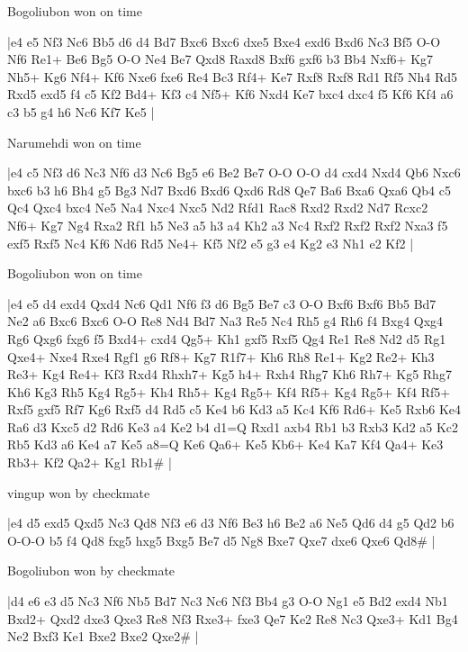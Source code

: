 Bogoliubon won on time

\makegametitle
|e4 e5 Nf3 Nc6 Bb5 d6 d4 Bd7 Bxc6 Bxc6 dxe5 Bxe4 exd6 Bxd6 Nc3 Bf5 O-O Nf6 Re1+ Be6 Bg5 O-O Ne4 Be7 Qxd8 Raxd8 Bxf6 gxf6 b3 Bb4 Nxf6+ Kg7 Nh5+ Kg6 Nf4+ Kf6 Nxe6 fxe6 Re4 Bc3 Rf4+ Ke7 Rxf8 Rxf8 Rd1 Rf5 Nh4 Rd5 Rxd5 exd5 f4 c5 Kf2 Bd4+ Kf3 c4 Nf5+ Kf6 Nxd4 Ke7 bxc4 dxc4 f5 Kf6 Kf4 a6 c3 b5 g4 h6 Nc6 Kf7 Ke5  |

\showboard

Narumehdi won on time

\makegametitle
|e4 c5 Nf3 d6 Nc3 Nf6 d3 Nc6 Bg5 e6 Be2 Be7 O-O O-O d4 cxd4 Nxd4 Qb6 Nxc6 bxc6 b3 h6 Bh4 g5 Bg3 Nd7 Bxd6 Bxd6 Qxd6 Rd8 Qe7 Ba6 Bxa6 Qxa6 Qb4 c5 Qc4 Qxc4 bxc4 Ne5 Na4 Nxc4 Nxc5 Nd2 Rfd1 Rac8 Rxd2 Rxd2 Nd7 Rcxc2 Nf6+ Kg7 Ng4 Rxa2 Rf1 h5 Ne3 a5 h3 a4 Kh2 a3 Nc4 Rxf2 Rxf2 Rxf2 Nxa3 f5 exf5 Rxf5 Nc4 Kf6 Nd6 Rd5 Ne4+ Kf5 Nf2 e5 g3 e4 Kg2 e3 Nh1 e2 Kf2  |

\showboard

Bogoliubon won on time

\makegametitle
|e4 e5 d4 exd4 Qxd4 Nc6 Qd1 Nf6 f3 d6 Bg5 Be7 c3 O-O Bxf6 Bxf6 Bb5 Bd7 Ne2 a6 Bxc6 Bxc6 O-O Re8 Nd4 Bd7 Na3 Re5 Nc4 Rh5 g4 Rh6 f4 Bxg4 Qxg4 Rg6 Qxg6 fxg6 f5 Bxd4+ cxd4 Qg5+ Kh1 gxf5 Rxf5 Qg4 Re1 Re8 Nd2 d5 Rg1 Qxe4+ Nxe4 Rxe4 Rgf1 g6 Rf8+ Kg7 R1f7+ Kh6 Rh8 Re1+ Kg2 Re2+ Kh3 Re3+ Kg4 Re4+ Kf3 Rxd4 Rhxh7+ Kg5 h4+ Rxh4 Rhg7 Kh6 Rh7+ Kg5 Rhg7 Kh6 Kg3 Rh5 Kg4 Rg5+ Kh4 Rh5+ Kg4 Rg5+ Kf4 Rf5+ Kg4 Rg5+ Kf4 Rf5+ Rxf5 gxf5 Rf7 Kg6 Rxf5 d4 Rd5 c5 Ke4 b6 Kd3 a5 Kc4 Kf6 Rd6+ Ke5 Rxb6 Ke4 Ra6 d3 Kxc5 d2 Rd6 Ke3 a4 Ke2 b4 d1=Q Rxd1 axb4 Rb1 b3 Rxb3 Kd2 a5 Kc2 Rb5 Kd3 a6 Ke4 a7 Ke5 a8=Q Ke6 Qa6+ Ke5 Kb6+ Ke4 Ka7 Kf4 Qa4+ Ke3 Rb3+ Kf2 Qa2+ Kg1 Rb1\#  |

\showboard

vingup won by checkmate

\makegametitle
|e4 d5 exd5 Qxd5 Nc3 Qd8 Nf3 e6 d3 Nf6 Be3 h6 Be2 a6 Ne5 Qd6 d4 g5 Qd2 b6 O-O-O b5 f4 Qd8 fxg5 hxg5 Bxg5 Be7 d5 Ng8 Bxe7 Qxe7 dxe6 Qxe6 Qd8\#  |

\showboard

Bogoliubon won by checkmate

\makegametitle
|d4 e6 e3 d5 Nc3 Nf6 Nb5 Bd7 Nc3 Nc6 Nf3 Bb4 g3 O-O Ng1 e5 Bd2 exd4 Nb1 Bxd2+ Qxd2 dxe3 Qxe3 Re8 Nf3 Rxe3+ fxe3 Qe7 Ke2 Re8 Nc3 Qxe3+ Kd1 Bg4 Ne2 Bxf3 Ke1 Bxe2 Bxe2 Qxe2\#  |

